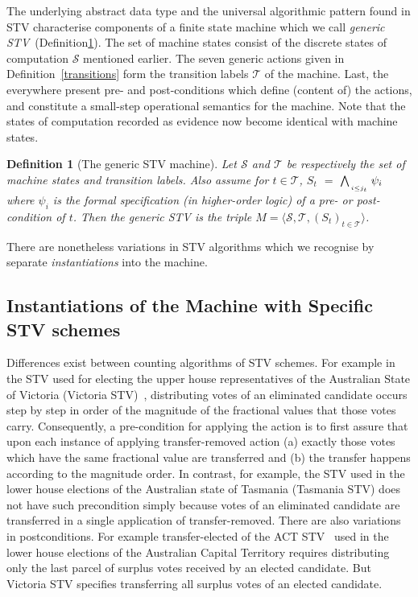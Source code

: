 \documentclass[10pt,conference]{IEEEtran}
\newtheorem{definition}{Definition}
\begin{document}
The underlying abstract data type and the universal algorithmic
pattern found in STV characterise components of a finite state
machine which we call \emph{generic
STV}~(Definition\ref{STVMachine}). The set of machine states consist
of the discrete states of computation $\mathcal{S}$ mentioned
earlier. The seven generic actions given in
Definition~\ref{transitions} form the transition labels
$\mathcal{T}$ of the machine. Last, the everywhere present pre- and
post-conditions which define (content of)  the actions, and
constitute a small-step operational semantics for the machine.  
Note that the states of computation recorded as evidence now become identical with machine states.


\begin{definition}[The generic STV machine]\label{STVMachine}
Let $\mathcal{S}$  and $\mathcal{T}$
be respectively the set of machine states and transition labels.  Also assume for $t\in\mathcal{T}$, $S_{t}$ $=$ $\bigwedge_{\atop{i\leq j_{t}}} \psi_{i}$ 
 where $\psi_{i}$ is the formal specification (in higher-order logic) of a pre- or post-condition of $t$. Then the \emph{generic STV} is the triple $M = \langle \mathcal{S}, \mathcal{T}, (S_t)_{t \in \mathcal{T}} \rangle$.  
\end{definition}
There are nonetheless variations in STV algorithms  which we  recognise  by separate \emph{instantiations} into the machine.  
\subsection{Instantiations of the Machine with Specific STV schemes}
\noindent
Differences exist between counting algorithms of STV schemes.  For
example in the STV used for electing the upper house representatives
of the Australian State of Victoria (Victoria STV)~\cite{vic},
distributing votes of an eliminated candidate occurs step by step in
order of the magnitude of the fractional values that those votes
carry.  Consequently, a pre-condition for applying the action is to
first assure that upon each instance of applying transfer-removed
action (a) exactly those votes which have the same fractional value
are transferred and (b) the transfer happens according to the
magnitude order. In contrast, for example, the STV used in the lower
house elections of the Australian state of Tasmania (Tasmania STV)
does not have such precondition simply because votes of an
eliminated candidate are transferred in a single application of
transfer-removed. There are also variations in postconditions. For
example transfer-elected of the ACT STV~\cite{act} used in the lower
house elections of the Australian Capital Territory  requires distributing only the last parcel of surplus votes received by an elected candidate. But Victoria STV specifies transferring all surplus votes of an elected candidate.  
\end{document}
